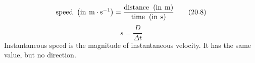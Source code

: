     \begin{equation}
    \mathrm{speed}\phantom{\rule{4pt}{0ex}}\left(\mathrm{in}\phantom{\rule{4pt}{0ex}}\mathrm{m}\ensuremath{\cdot}{\mathrm{s}}^{-1}\right)=\frac{\mathrm{distance}\phantom{\rule{4pt}{0ex}}\left(\mathrm{in}\phantom{\rule{4pt}{0ex}}\mathrm{m}\right)}{\mathrm{time}\phantom{\rule{4pt}{0ex}}\left(\mathrm{in}\phantom{\rule{4pt}{0ex}}\mathrm{s}\right)}\tag{20.8}
      \end{equation}
      \label{m38791*id64639}\nopagebreak\noindent{}
    \begin{equation}
    s=\frac{D}{\Delta t}\tag{20.9}
      \end{equation}
      \label{m38791*id64664}Instantaneous speed is the magnitude of instantaneous velocity. It has the same value, but no direction.\par 
\label{m38791*secfhsst!!!underscore!!!id678}\vspace{.5cm} 
      \noindent
